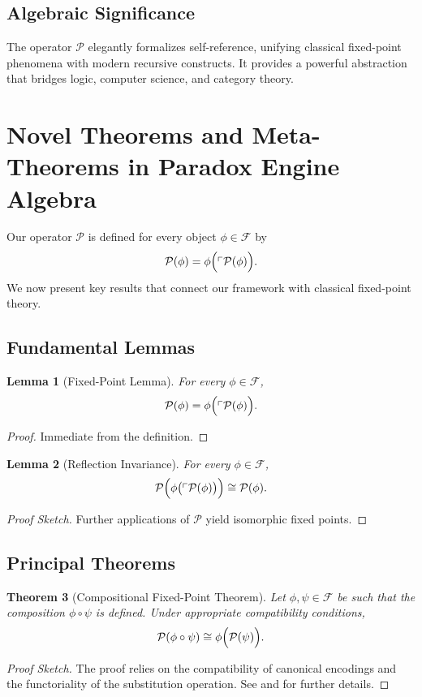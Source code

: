 \documentclass[12pt]{amsart}
\theoremstyle{plain}
\newtheorem{theorem}{Theorem}[section]
\newtheorem{lemma}[theorem]{Lemma}
\theoremstyle{definition}
\theoremstyle{remark}
\begin{document}
\subsection{Algebraic Significance}
The operator $\mathcal{P}$ elegantly formalizes self-reference, unifying classical fixed-point phenomena with modern recursive constructs. It provides a powerful abstraction that bridges logic, computer science, and category theory.

\section{Novel Theorems and Meta-Theorems in Paradox Engine Algebra}

Our operator $\mathcal{P}$ is defined for every object $\phi\in \mathcal{F}$ by
\[
\mathcal{P}(\phi) = \phi\Bigl(\ulcorner \mathcal{P}(\phi) \Bigr).
\]
We now present key results that connect our framework with classical fixed-point theory.

\subsection{Fundamental Lemmas}
\begin{lemma}[Fixed-Point Lemma]
For every $\phi\in \mathcal{F}$,
\[
\mathcal{P}(\phi) = \phi\Bigl(\ulcorner \mathcal{P}(\phi) \Bigr).
\]
\end{lemma}
\begin{proof}
Immediate from the definition.
\end{proof}

\begin{lemma}[Reflection Invariance]
For every $\phi\in \mathcal{F}$,
\[
\mathcal{P}\Bigl(\phi\bigl(\ulcorner \mathcal{P}(\phi) \bigr)\Bigr) \cong \mathcal{P}(\phi).
\]
\end{lemma}
\begin{proof}[Proof Sketch]
Further applications of $\mathcal{P}$ yield isomorphic fixed points.
\end{proof}

\subsection{Principal Theorems}
\begin{theorem}[Compositional Fixed-Point Theorem]
Let $\phi, \psi\in \mathcal{F}$ be such that the composition $\phi\circ\psi$ is defined. Under appropriate compatibility conditions,
\[
\mathcal{P}(\phi\circ\psi) \cong \phi\Bigl(\mathcal{P}(\psi)\Bigr).
\]
\end{theorem}
\begin{proof}[Proof Sketch]
The proof relies on the compatibility of canonical encodings and the functoriality of the substitution operation. See \cite{MacLane1971} and \cite{Lawvere1969} for further details.
\end{proof}
\end{document}
